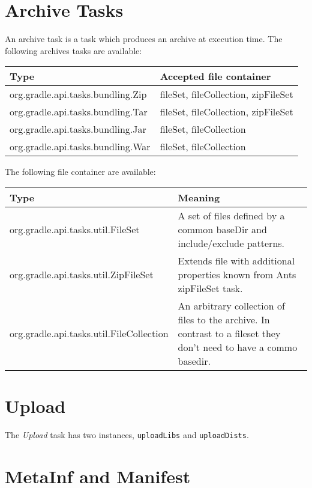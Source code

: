 \section{Archive Tasks} %
\label{sec:archive_tasks}
An archive task is a task which produces an archive at execution time. The following archives tasks are available:
\begin{center}
	\begin{tabular}{|l|l|} \hline
		Type & Accepted file container \\ \hline
		org.gradle.api.tasks.bundling.Zip & fileSet, fileCollection, zipFileSet \\ \hline
		org.gradle.api.tasks.bundling.Tar & fileSet, fileCollection, zipFileSet \\ \hline
		org.gradle.api.tasks.bundling.Jar & fileSet, fileCollection \\ \hline
		org.gradle.api.tasks.bundling.War & fileSet, fileCollection \\ \hline		
	\end{tabular}
\end{center}
The following file container are available:
\begin{center}
	\begin{tabular}{|l|l|} \hline
		Type & Meaning \\ \hline
		org.gradle.api.tasks.util.FileSet & A set of files defined by a common baseDir and include/exclude patterns. \\ \hline
		org.gradle.api.tasks.util.ZipFileSet & Extends file with additional properties known from Ants zipFileSet task.\\ \hline
		org.gradle.api.tasks.util.FileCollection & An arbitrary collection of files to the archive. In contrast to a fileset they don't need to have a commo basedir.\\ \hline		
	\end{tabular}
\end{center}

\section{Upload} %
\label{sec:upload}
The \emph{Upload} task has two instances, \texttt{uploadLibs} and \texttt{uploadDists}.

\section{MetaInf and Manifest} %
\label{sec:metainf_and_manifest}

